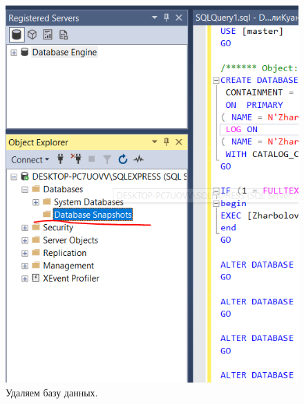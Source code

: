 \begin{figure}[h!]
    \begin{minipage}[p]{0.45\linewidth}
        \centering
        \includegraphics[width=1\linewidth]{Pic/lab1/DBDELETE.PNG}
        \caption{Удаляем базу данных.}
        \label{fig:DBDELETE}
    \end{minipage}
    \hfill
    \begin{minipage}[p]{0.45\linewidth}
        \centering

\end{minipage}
\end{figure}
